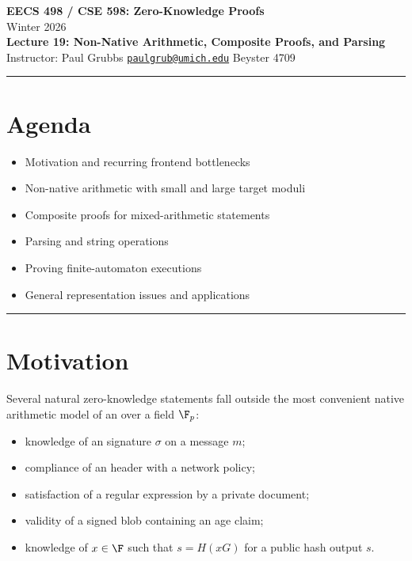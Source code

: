 \documentclass[11pt]{article}
\begin{document}
\begin{center}
  {\LARGE \textbf{EECS 498 / CSE 598: Zero-Knowledge Proofs}}\\[6pt]
  {\large Winter 2026}\\[4pt]
  {\large \textbf{Lecture 19: Non-Native Arithmetic, Composite Proofs, and Parsing}}\\[4pt]
  {\large Instructor: Paul Grubbs \quad
    \href{mailto:paulgrub@umich.edu}{\texttt{paulgrub@umich.edu}} \quad
    Beyster 4709}
\end{center}

\vspace{0.5em}
\hrule
\vspace{1em}

\section*{Agenda}
\begin{itemize}
  \item Motivation and recurring frontend bottlenecks
  \item Non-native arithmetic with small and large target moduli
  \item Composite proofs for mixed-arithmetic statements
  \item Parsing and string operations
  \item Proving finite-automaton executions
  \item General representation issues and applications
\end{itemize}

\hrule
\vspace{1em}

\section{Motivation}

Several natural zero-knowledge statements fall outside the most convenient
native arithmetic model of an  over a field $\F_p$:
\begin{itemize}
  \item knowledge of an  signature $\sigma$ on a message $m$;
  \item compliance of an  header with a network policy;
  \item satisfaction of a regular expression by a private document;
  \item validity of a signed  blob containing an age claim;
  \item knowledge of $x \in \F$ such that $s = H(xG)$ for a public hash output $s$.
\end{itemize}
\end{document}
